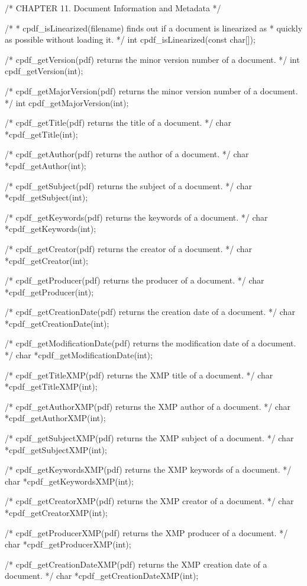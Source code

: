 /* CHAPTER 11. Document Information and Metadata */

/*
 * cpdf_isLinearized(filename) finds out if a document is linearized as
 * quickly as possible without loading it.
 */
int cpdf_isLinearized(const char[]);

/* cpdf_getVersion(pdf) returns the minor version number of a document. */
int cpdf_getVersion(int);

/* cpdf_getMajorVersion(pdf) returns the minor version number of a document. */
int cpdf_getMajorVersion(int);

/* cpdf_getTitle(pdf) returns the title of a document. */
char *cpdf_getTitle(int);

/* cpdf_getAuthor(pdf) returns the author of a document. */
char *cpdf_getAuthor(int);

/* cpdf_getSubject(pdf) returns the subject of a document. */
char *cpdf_getSubject(int);

/* cpdf_getKeywords(pdf) returns the keywords of a document. */
char *cpdf_getKeywords(int);

/* cpdf_getCreator(pdf) returns the creator of a document. */
char *cpdf_getCreator(int);

/* cpdf_getProducer(pdf) returns the producer of a document. */
char *cpdf_getProducer(int);

/* cpdf_getCreationDate(pdf) returns the creation date of a document. */
char *cpdf_getCreationDate(int);

/* cpdf_getModificationDate(pdf) returns the modification date of a document. */
char *cpdf_getModificationDate(int);

/* cpdf_getTitleXMP(pdf) returns the XMP title of a document. */
char *cpdf_getTitleXMP(int);

/* cpdf_getAuthorXMP(pdf) returns the XMP author of a document. */
char *cpdf_getAuthorXMP(int);

/* cpdf_getSubjectXMP(pdf) returns the XMP subject of a document. */
char *cpdf_getSubjectXMP(int);

/* cpdf_getKeywordsXMP(pdf) returns the XMP keywords of a document. */
char *cpdf_getKeywordsXMP(int);

/* cpdf_getCreatorXMP(pdf) returns the XMP creator of a document. */
char *cpdf_getCreatorXMP(int);

/* cpdf_getProducerXMP(pdf) returns the XMP producer of a document. */
char *cpdf_getProducerXMP(int);

/* cpdf_getCreationDateXMP(pdf) returns the XMP creation date of a document. */
char *cpdf_getCreationDateXMP(int);

